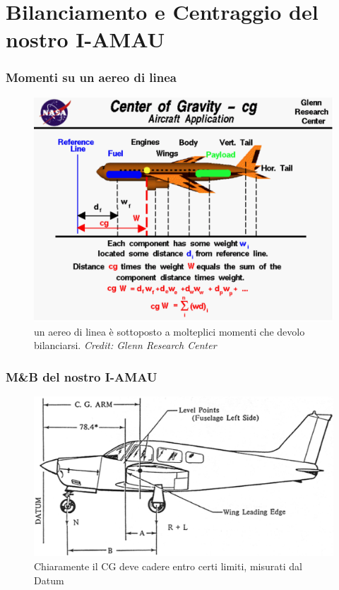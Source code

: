 \documentclass{beamer}
\begin{document}
\section{Bilanciamento e Centraggio del nostro I-AMAU}
\begin{frame}
\frametitle{Momenti su un aereo di linea}
\begin{figure}
\includegraphics[scale=0.33]{./images/complexmab}
\caption{un aereo di linea è sottoposto a molteplici momenti che devolo bilanciarsi. \textit{Credit: Glenn Research Center}}
\end{figure}
\end{frame}

\begin{frame}
\frametitle{M\&B del nostro I-AMAU}
\begin{figure}
\includegraphics[scale=0.33]{./images/pa28}
\caption{Chiaramente il CG deve cadere entro certi limiti, misurati dal Datum}
\end{figure}
\end{frame}
\end{document}
